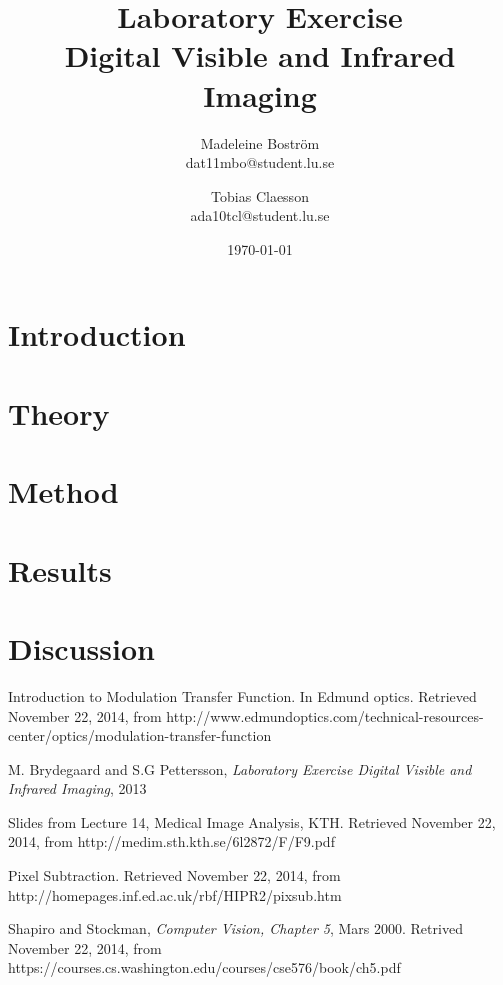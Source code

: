 \documentclass[a4paper]{article}
\begin{document}
\title{Laboratory Exercise \\Digital Visible and Infrared Imaging}
\author{
	Madeleine Bostr\"{o}m\\
	dat11mbo@student.lu.se
	\and
	Tobias Claesson\\
	ada10tcl@student.lu.se
}
\date{\today}
\maketitle


\section{Introduction}


\section{Theory}


\section{Method}


\section{Results}


\section{Discussion}


\clearpage

\begin{thebibliography}{count}
	Introduction to Modulation Transfer Function. In Edmund optics. Retrieved November 22, 2014, from  http://www.edmundoptics.com/technical-resources-center/optics/modulation-transfer-function
	
	M. Brydegaard and S.G Pettersson,
	\emph{Laboratory Exercise Digital Visible and Infrared Imaging}, 2013
	
	Slides from Lecture 14, Medical Image Analysis, KTH. Retrieved November 22, 2014, from http://medim.sth.kth.se/6l2872/F/F9.pdf
	
	Pixel Subtraction. Retrieved November 22, 2014, from http://homepages.inf.ed.ac.uk/rbf/HIPR2/pixsub.htm
	
	Shapiro and Stockman,
	\emph{Computer Vision, Chapter 5}, Mars 2000. Retrived November 22, 2014, from 
	https://courses.cs.washington.edu/courses/cse576/book/ch5.pdf
\end{thebibliography}
\end{document}
